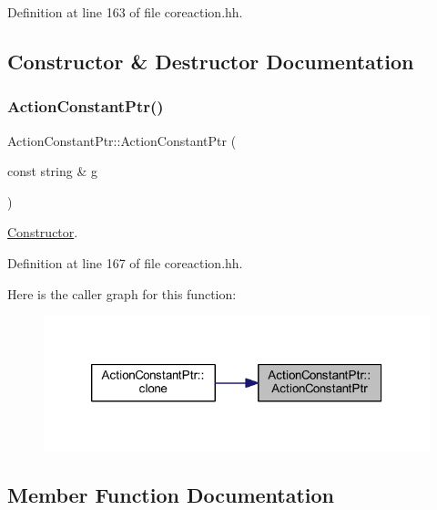 Definition at line 163 of file coreaction.\+hh.



\subsection{Constructor \& Destructor Documentation}
\mbox{\label{class_action_constant_ptr_a99f3b7ac26692122d7da9b5a7f61c255}} 
\subsubsection{\texorpdfstring{ActionConstantPtr()}{ActionConstantPtr()}}
{\footnotesize\ttfamily Action\+Constant\+Ptr\+::\+Action\+Constant\+Ptr (\begin{DoxyParamCaption}\item[{const string \&}]{g }\end{DoxyParamCaption})\hspace{0.3cm}{\ttfamily [inline]}}



\mbox{\hyperlink{class_constructor}{Constructor}}. 



Definition at line 167 of file coreaction.\+hh.

Here is the caller graph for this function\+:
\nopagebreak
\begin{figure}[H]
\begin{center}
\leavevmode
\includegraphics[width=320pt]{class_action_constant_ptr_a99f3b7ac26692122d7da9b5a7f61c255_icgraph}
\end{center}
\end{figure}


\subsection{Member Function Documentation}
\mbox{\label{class_action_constant_ptr_a3667d599128a545967351ba54f4cce42}} 
